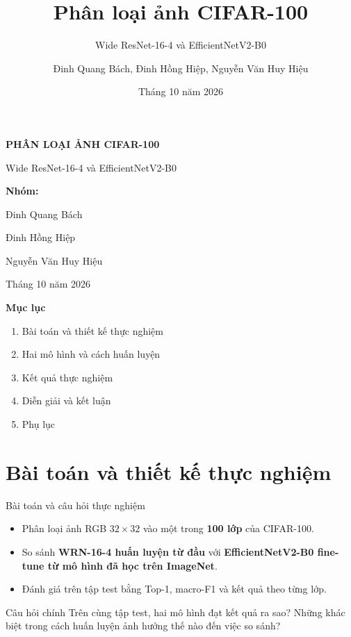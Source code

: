 \documentclass[aspectratio=169,10pt]{beamer}
\title{Phân loại ảnh CIFAR-100}
\subtitle{Wide ResNet-16-4 và EfficientNetV2-B0}
\author{Đinh Quang Bách, Đinh Hồng Hiệp, Nguyễn Văn Huy Hiệu}
\date{Tháng 10 năm 2026}
\begin{document}
\begin{frame}[plain]{}
  \begin{center}
    \vspace{0.5em}
    {\LARGE\bfseries\color{navy}PHÂN LOẠI ẢNH CIFAR-100\par}
    \vspace{0.6em}
    {\large Wide ResNet-16-4 và EfficientNetV2-B0\par}
    \vspace{1.4em}
    {\normalsize\bfseries Nhóm:\par}
    \vspace{0.3em}
    {\normalsize Đinh Quang Bách\par}
    {\normalsize Đinh Hồng Hiệp\par}
    {\normalsize Nguyễn Văn Huy Hiệu\par}
    \vspace{1.2em}
    {\small Tháng 10 năm 2026\par}
  \end{center}
\end{frame}

\begin{frame}[plain]{}
  {\Large\bfseries\color{navy}Mục lục\par}
  \vspace{0.8em}
  \large
  \begin{enumerate}
    \setlength{\itemsep}{0.55em}
    \item Bài toán và thiết kế thực nghiệm
    \item Hai mô hình và cách huấn luyện
    \item Kết quả thực nghiệm
    \item Diễn giải và kết luận
    \item Phụ lục
  \end{enumerate}
\end{frame}

\section{Bài toán và thiết kế thực nghiệm}

\begin{frame}{Bài toán và câu hỏi thực nghiệm}
  \begin{itemize}
    \item Phân loại ảnh RGB $32\times32$ vào một trong \textbf{100 lớp} của CIFAR-100.
    \item So sánh \textbf{WRN-16-4 huấn luyện từ đầu} với \textbf{EfficientNetV2-B0 fine-tune từ mô hình đã học trên ImageNet}.
    \item Đánh giá trên tập test bằng Top-1, macro-F1 và kết quả theo từng lớp.
  \end{itemize}
  \vspace{0.7em}
  \begin{block}{Câu hỏi chính}
    Trên cùng tập test, hai mô hình đạt kết quả ra sao? Những khác biệt trong cách huấn luyện ảnh hưởng thế nào đến việc so sánh?
  \end{block}
\end{frame}
\end{document}
